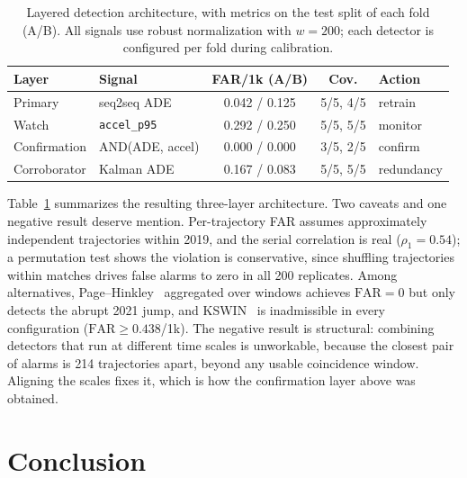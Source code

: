 \documentclass[conference]{IEEEtran}
\newif\ifmarkchanges
\newcommand{\chg}[1]{\ifmarkchanges\hl{#1}\else#1\fi}
\begin{document}
\begin{table}[!t]
\centering
\caption{Layered detection architecture, with metrics on the test split of
each fold (A/B). All signals use robust normalization with $w = 200$; each
detector is configured per fold during calibration.}
\label{tab:detection}
\footnotesize
\setlength{\tabcolsep}{3pt}
\begin{tabular}{@{}llccl@{}}
\toprule
\textbf{Layer} & \textbf{Signal} & \textbf{FAR/1k (A/B)} & \textbf{Cov.}
 & \textbf{Action} \\
\midrule
Primary      & seq2seq ADE          & 0.042 / 0.125 & 5/5, 4/5 & retrain \\
Watch        & \texttt{accel\_p95}  & 0.292 / 0.250 & 5/5, 5/5 & monitor \\
Confirmation & AND(ADE, accel)      & 0.000 / 0.000 & 3/5, 2/5 & confirm \\
\midrule
Corroborator & \chg{Kalman} ADE     & 0.167 / 0.083 & 5/5, 5/5 & redundancy \\
\bottomrule
\end{tabular}
\end{table}

Table~\ref{tab:detection} summarizes the resulting three-layer architecture.
Two caveats and one negative result deserve mention. Per-trajectory FAR assumes
approximately independent trajectories within 2019, and the serial correlation
is real ($\rho_1 = 0.54$); a permutation test shows the violation is
conservative, since shuffling trajectories within matches drives false alarms
to zero in all 200 replicates. Among alternatives, Page--Hinkley~\cite{page_hinkley}
aggregated over windows achieves $\mathrm{FAR} = 0$ but only detects the abrupt
2021 jump, and KSWIN~\cite{kswin} is inadmissible in every configuration
($\mathrm{FAR} \geq 0.438$/1k). The negative result is structural: combining
detectors that run at different time scales is unworkable, because the closest
pair of alarms is 214 trajectories apart, beyond any usable coincidence window.
Aligning the scales fixes it, which is how the confirmation layer above was
obtained.

\section{Conclusion}
\label{sec:conclusion}
\end{document}
